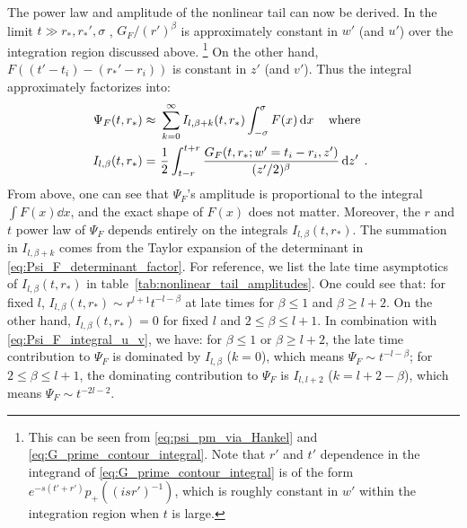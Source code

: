 \documentclass[reprint,aps,physrev,superscriptaddress,10pt,notitlepage,prd,nofootinbib,onecolumn]{revtex4-2}
\newcommand{\tref}[1]{table~\ref{#1}}
\begin{document}
The power law and amplitude of the nonlinear tail can now be derived.
In the limit $t \gg r_*, r_*', \sigma$ , $G_F / (r')^\beta$ is approximately constant in $w'$ (and $u'$) over the integration region discussed above.
\footnote{This can be seen from \eqref{eq:psi_pm_via_Hankel} and \eqref{eq:G_prime_contour_integral}.  Note that $r'$ and $t'$ dependence in the integrand of \eqref{eq:G_prime_contour_integral} is of the form $e^{-s (t' + r')} p_+((i s r')^{-1}) $, which is roughly constant in $w'$ within the integration region when $t$ is large.  } 
On the other hand, $F((t'-t_i)-(r_*'-r_i))$ is constant in $z'$ (and $v'$).
Thus the integral approximately factorizes into:
\begin{align}
  \label{eq:Psi_F_integral_u_v}
  \Psi_F(t,r_*)
  \approx \ & \sum_{k=0}^\infty I_{l,\beta+k}(t,r_*) \int_{-\sigma}^\sigma F(x) \dd{x} \qq{where} \nonumber \\
  I_{l,\beta}(t,r_*) = \ &  \frac12  \int_{t-r}^{t+r} \frac{G_F(t,r_*;w'=t_i-r_i, z')}{(z'/2)^\beta} \dd{z'} \;.
\end{align}
From above, one can see that $\Psi_F$'s amplitude is proportional to the integral $\int F(x) \dd{x}$, and the exact shape of $F(x)$ does not matter.
Moreover, the $r$ and $t$ power law of $\Psi_F$ depends entirely on the integrals $I_{l,\beta}(t,r_*)$.
The summation in $I_{l,\beta+k}$ comes from the Taylor expansion of the determinant in \eqref{eq:Psi_F_determinant_factor}.
For reference, we list the late time asymptotics of $I_{l,\beta}(t,r_*)$ in \tref{tab:nonlinear_tail_amplitudes}.
One could see that: for fixed $l$, $I_{l,\beta}(t,r_*) \sim r^{l+1} t^{-l-\beta}$ at late times for $\beta \leq 1$ and $\beta \geq l+2$.
On the other hand, $I_{l,\beta}(t,r_*) = 0$ for fixed $l$ and $2 \leq \beta \leq l+1$.
In combination with \eqref{eq:Psi_F_integral_u_v}, we have: for $\beta \leq 1$ or $\beta \geq l+2$, the late time contribution to $\Psi_F$ is dominated by $I_{l,\beta}$ ($k=0$), which means $\Psi_F \sim t^{-l-\beta}$; for $2 \leq \beta \leq l+1$, the dominating contribution to $\Psi_F$ is $I_{l,l+2}$ ($k=l+2-\beta$), which means $\Psi_F \sim t^{-2l-2}$.
\end{document}
